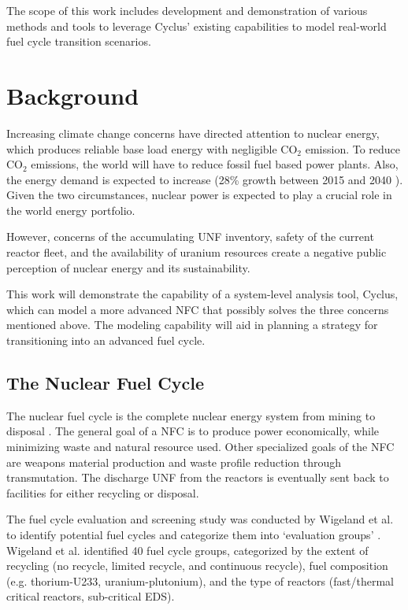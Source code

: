 The scope of this work includes development and demonstration of
various methods and tools to leverage Cyclus' existing
capabilities to model real-world fuel cycle transition scenarios.

\section{Background}
Increasing climate change concerns have directed attention
to nuclear energy, which produces reliable base load energy
with negligible CO$_2$ emission. To reduce CO$_2$ emissions,
the world will have to reduce fossil fuel based power plants.
Also, the energy demand is expected to increase
(28\% growth between 2015 and 2040 \cite{conti_international_2016}).
Given the two circumstances,
nuclear power is expected to play a crucial role in the world energy portfolio.

However, concerns of the accumulating \gls{UNF} inventory,
safety of the current reactor fleet, and the availability of
uranium resources create a negative public perception of
nuclear energy and its sustainability.

This work will demonstrate the capability of a system-level
analysis tool, Cyclus, which can model a more advanced \gls{NFC} that
possibly solves the three concerns mentioned above. 
The modeling capability will aid in planning a strategy for
transitioning into an advanced fuel cycle.

\subsection{The Nuclear Fuel Cycle}
The nuclear fuel cycle is the complete nuclear energy
system from mining to disposal \cite{tsoulfanidis_nuclear_2013}.
The general goal of
a \gls{NFC} is to produce power economically, while minimizing
waste and natural resource used. Other specialized goals of the \gls{NFC} are
weapons material production and waste profile reduction through transmutation.
The discharge \gls{UNF} from the reactors is eventually sent back to facilities for
either recycling or disposal.

The fuel cycle evaluation and screening study was
conducted by Wigeland et al. to identify potential
fuel cycles and categorize them into `evaluation groups' \cite{wigeland_nuclear_2014}.
Wigeland et al. identified 40 fuel cycle groups, categorized by the extent of recycling
(no recycle, limited recycle, and continuous recycle), fuel composition
(e.g. thorium-U233, uranium-plutonium), and the type of reactors (fast/thermal critical
reactors, sub-critical \gls{EDS}).


